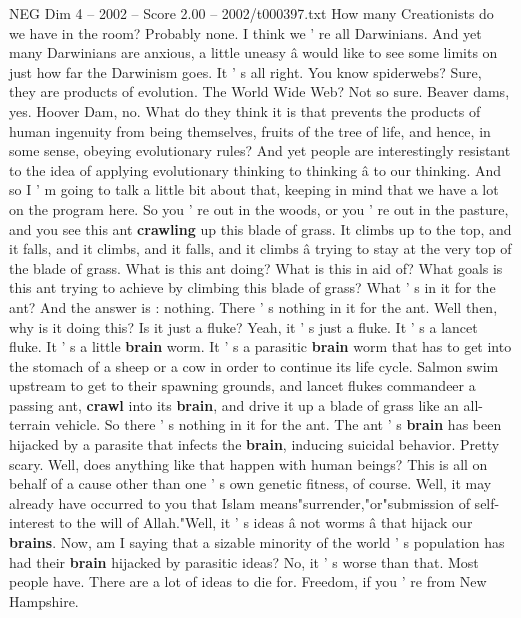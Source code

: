 \begin{textsample}{NEG Dim 4 – 2002 – Score 2.00 – 2002/t000397.txt}  \label{ex:f4_neg_060}
How many Creationists do we have in the room?
Probably none.
I think we ' re all Darwinians.
And yet many Darwinians are anxious, a little uneasy â would like to see some limits on just how far the Darwinism goes.
It ' s all right.
You know spiderwebs?
Sure, they are products of evolution.
The World Wide Web?
Not so sure.
Beaver dams, yes.
Hoover Dam, no.
What do they think it is that prevents the products of human ingenuity from being themselves, fruits of the tree of life, and hence, in some sense, obeying evolutionary rules?
And yet people are interestingly resistant to the idea of applying evolutionary thinking to thinking â to our thinking.
And so I ' m going to talk a little bit about that, keeping in mind that we have a lot on the program here.
So you ' re out in the woods, or you ' re out in the pasture, and you see this ant \textbf{crawling} up this blade of grass.
It climbs up to the top, and it falls, and it climbs, and it falls, and it climbs â trying to stay at the very top of the blade of grass.
What is this ant doing?
What is this in aid of?
What goals is this ant trying to achieve by climbing this blade of grass?
What ' s in it for the ant?
And the answer is : nothing.
There ' s nothing in it for the ant.
Well then, why is it doing this?
Is it just a fluke?
Yeah, it ' s just a fluke.
It ' s a lancet fluke.
It ' s a little \textbf{brain} worm.
It ' s a parasitic \textbf{brain} worm that has to get into the stomach of a sheep or a cow in order to continue its life cycle.
Salmon swim upstream to get to their spawning grounds, and lancet flukes commandeer a passing ant, \textbf{crawl} into its \textbf{brain}, and drive it up a blade of grass like an all-terrain vehicle.
So there ' s nothing in it for the ant.
The ant ' s \textbf{brain} has been hijacked by a parasite that infects the \textbf{brain}, inducing suicidal behavior.
Pretty scary.
Well, does anything like that happen with human beings?
This is all on behalf of a cause other than one ' s own genetic fitness, of course.
Well, it may already have occurred to you that Islam means"surrender,"or"submission of self-interest to the will of Allah."Well, it ' s ideas â not worms â that hijack our \textbf{brains}.
Now, am I saying that a sizable minority of the world ' s population has had their \textbf{brain} hijacked by parasitic ideas?
No, it ' s worse than that.
Most people have.
There are a lot of ideas to die for.
Freedom, if you ' re from New Hampshire.

\end{textsample}
